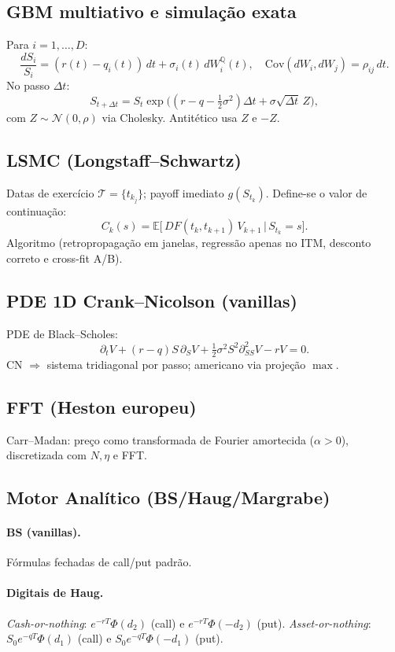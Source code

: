 ﻿\documentclass[11pt,a4paper]{article}
\begin{document}
\subsection{GBM multiativo e simulação exata}
Para $i=1,\dots,D$:
\[
\frac{dS_i}{S_i}=(r(t)-q_i(t))\,dt+\sigma_i(t)\,dW_i^{\mathbb Q}(t),\quad
\mathrm{Cov}(dW_i,dW_j)=\rho_{ij}\,dt.
\]
No passo $\Delta t$: 
\[
S_{t+\Delta t} = S_t\exp\!\Big((r-q-\tfrac12\sigma^2)\Delta t + \sigma\sqrt{\Delta t}\,Z\Big),
\]
com $Z\sim \mathcal N(0,\rho)$ via Cholesky. Antitético usa $Z$ e $-Z$.

\subsection{LSMC (Longstaff--Schwartz)}
Datas de exercício $\mathcal T=\{t_{k_j}\}$; payoff imediato $g(S_{t_k})$.
Define-se o valor de continuação:
\[
C_k(s)=\mathbb E\!\big[\,DF(t_k,t_{k+1})\,V_{k+1}\,\big|\,S_{t_k}=s\big].
\]
Algoritmo (retropropagação em janelas, regressão apenas no ITM, desconto correto e cross-fit A/B).

\subsection{PDE 1D Crank--Nicolson (vanillas)}
PDE de Black--Scholes: 
\[
\partial_t V + (r-q)S\,\partial_S V + \tfrac12\sigma^2 S^2 \partial^2_{SS}V - rV = 0.
\]
CN $\Rightarrow$ sistema tridiagonal por passo; americano via projeção $\max$.

\subsection{FFT (Heston europeu)}
Carr--Madan: preço como transformada de Fourier amortecida ($\alpha>0$), discretizada com $N,\eta$ e FFT.

\subsection{Motor Analítico (BS/Haug/Margrabe)}
\paragraph{BS (vanillas).} Fórmulas fechadas de call/put padrão.
\paragraph{Digitais de Haug.}
\emph{Cash-or-nothing}: $e^{-rT}\Phi(d_2)$ (call) e $e^{-rT}\Phi(-d_2)$ (put).
\emph{Asset-or-nothing}: $S_0 e^{-qT}\Phi(d_1)$ (call) e $S_0 e^{-qT}\Phi(-d_1)$ (put).
\end{document}
